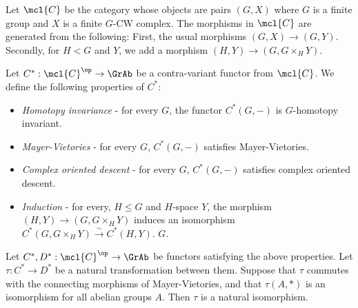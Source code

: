 \begin{definition}
	Let $\mcl{C}$ be the category whose objects are pairs $\left(G, X\right)$ where $G$ is a finite group and $X$ is a finite $G$-CW complex.
	The morphisms in $\mcl{C}$ are generated from the following:
	First, the usual morphisms $\left(G, X\right) \to \left(G, Y\right)$.
	Secondly, for $H < G$ and $Y$, we add a morphism $\left(H, Y\right) \to \left(G, G \times_H Y\right)$.
\end{definition}

\begin{definition}
	Let $C^*: \mcl{C}^\op \to \GrAb$ be a contra-variant functor from $\mcl{C}$.
	We define the following properties of $C^*$:
	\begin{itemize}
		\item \emph{Homotopy invariance} - for every $G$, the functor $C^*\left(G, -\right)$ is $G$-homotopy invariant.
		\item \emph{Mayer-Vietories} - for every $G$, $C^*\left(G, -\right)$ satisfies Mayer-Vietories.
		\item \emph{Complex oriented descent} - for every $G$, $C^*\left(G, -\right)$ satisfies complex oriented descent.
		\item \emph{Induction} - for every, $H \leq G$ and $H$-space $Y$, the morphism $\left(H, Y\right) \to \left(G, G \times_H Y\right)$ induces an isomorphism $C^*\left(G, G \times_H Y\right) \xrightarrow{\sim} C^*\left(H, Y\right)$. $G$.
	\end{itemize}
\end{definition}

\begin{theorem}\label{cmplx-oriented-natural-transformation}
	Let $C^*, D^*: \mcl{C}^\op \to \GrAb$ be functors satisfying the above properties.
	Let $\tau: C^* \to D^*$ be a natural transformation between them.
	Suppose that $\tau$ commutes with the connecting morphisms of Mayer-Vietories, and that $\tau\left(A, *\right)$ is an isomorphism for all abelian groups $A$.
	Then $\tau$ is a natural isomorphism.
\end{theorem}

